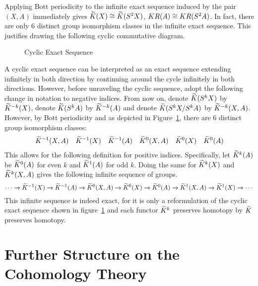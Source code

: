 \documentclass[../sean_thesis.tex]{subfiles}
\begin{document}
Applying Bott periodicity to the infinite exact sequence induced by the pair $(X,A)$ immediately gives $\widetilde{K}(X) \cong \widetilde{K}(S^2X)$,  $KR(A) \cong KR(S^2A)$. In fact, there are only $6$ distinct group isomorphism classes in the infinite exact sequence. This justifies drawing the following cyclic commutative diagram.
%
\begin{figure}[ht!]
	
	\caption{Cyclic Exact Sequence}
	\label{fig:cyclic_exact_sequence}
\end{figure}
%
A cyclic exact sequence can be interpreted as an exact sequence extending infinitely in both direction by continuing around the cycle infinitely in both directions. However, before unraveling the cyclic sequence, adopt the following change in notation to negative indices. From now on, denote $\widetilde{K}(S^kX)$ by $\widetilde{K}^{-k}(X)$, denote $\widetilde{K}(S^kA)$ by $\widetilde{K}^{-k}(A)$ and denote $\widetilde{K}(S^kX/S^kA)$ by $\widetilde{K}^{-k}(X,A)$. However, by Bott periodicity and as depicted in Figure~\ref{fig:cyclic_exact_sequence}, there are $6$ distinct group isomorphism classes:
%
\begin{align*}
	\widetilde{K}^{-1}(X,A) && \widetilde{K}^{-1}(X) && \widetilde{K}^{-1}(A) && 
	\widetilde{K}^{0}(X,A) && \widetilde{K}^{0}(X) && \widetilde{K}^{0}(A)
\end{align*}
%
This allows for the following definition for positive indices. Specifically, let $\widetilde{K}^{k}(A)$ be $\widetilde{K}^{0}(A)$ for even $k$ and $\widetilde{K}^{1}(A)$ for odd $k$. Doing the same for $\widetilde{K}^{k}(X)$ and $\widetilde{K}^{k}(X,A)$ gives the following infinite sequence of groups.
%
\begin{equation*}
	\cdots \xrightarrow{}
	\widetilde{K}^{-1}(X) \xrightarrow{}
	\widetilde{K}^{-1}(A) \xrightarrow{}
	\widetilde{K}^{0}(X,A) \xrightarrow{}
	\widetilde{K}^{0}(X) \xrightarrow{}
	\widetilde{K}^{0}(A) \xrightarrow{}
	\widetilde{K}^{1}(X,A) \xrightarrow{}
	\widetilde{K}^{1}(X) \xrightarrow{}
	\cdots
\end{equation*}
%
This infinite sequence is indeed exact, for it is only a reformulation of the cyclic exact sequence shown in figure~\ref{fig:cyclic_exact_sequence} and each functor $\widetilde{K}^{k}$ preserves homotopy by $\widetilde{K}$ preserves homotopy.



\section{Further Structure on the Cohomology Theory}
\end{document}
